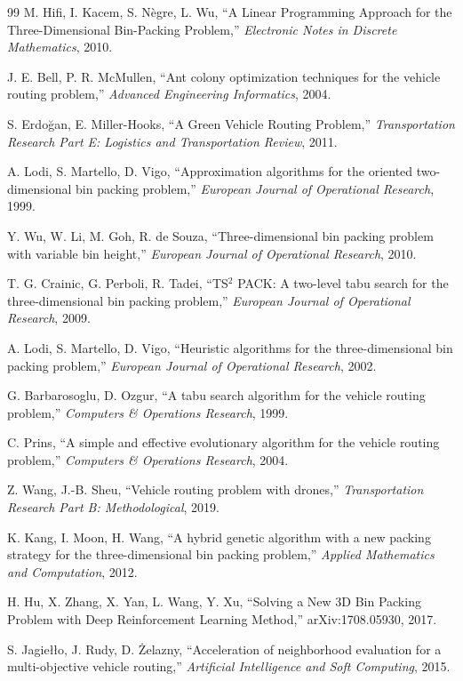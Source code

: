 \begin{thebibliography}{99}
M. Hifi, I. Kacem, S. Nègre, L. Wu,
“A Linear Programming Approach for the Three-Dimensional Bin-Packing Problem,”
\textit{Electronic Notes in Discrete Mathematics}, 2010.

J. E. Bell, P. R. McMullen,
“Ant colony optimization techniques for the vehicle routing problem,”
\textit{Advanced Engineering Informatics}, 2004.

S. Erdoğan, E. Miller-Hooks,
“A Green Vehicle Routing Problem,”
\textit{Transportation Research Part E: Logistics and Transportation Review}, 2011.

A. Lodi, S. Martello, D. Vigo,
“Approximation algorithms for the oriented two-dimensional bin packing problem,”
\textit{European Journal of Operational Research}, 1999.

Y. Wu, W. Li, M. Goh, R. de Souza,
“Three-dimensional bin packing problem with variable bin height,”
\textit{European Journal of Operational Research}, 2010.

T. G. Crainic, G. Perboli, R. Tadei,
“TS$^2$ PACK: A two-level tabu search for the three-dimensional bin packing problem,”
\textit{European Journal of Operational Research}, 2009.

A. Lodi, S. Martello, D. Vigo,
“Heuristic algorithms for the three-dimensional bin packing problem,”
\textit{European Journal of Operational Research}, 2002.

G. Barbarosoglu, D. Ozgur,
“A tabu search algorithm for the vehicle routing problem,”
\textit{Computers \& Operations Research}, 1999.

C. Prins,
“A simple and effective evolutionary algorithm for the vehicle routing problem,”
\textit{Computers \& Operations Research}, 2004.

Z. Wang, J.-B. Sheu,
“Vehicle routing problem with drones,”
\textit{Transportation Research Part B: Methodological}, 2019.

K. Kang, I. Moon, H. Wang,
“A hybrid genetic algorithm with a new packing strategy for the three-dimensional bin packing problem,”
\textit{Applied Mathematics and Computation}, 2012.

H. Hu, X. Zhang, X. Yan, L. Wang, Y. Xu,
“Solving a New 3D Bin Packing Problem with Deep Reinforcement Learning Method,”
arXiv:1708.05930, 2017.

S. Jagiełło, J. Rudy, D. Żelazny,
“Acceleration of neighborhood evaluation for a multi-objective vehicle routing,”
\textit{Artificial Intelligence and Soft Computing}, 2015.


\end{thebibliography}
